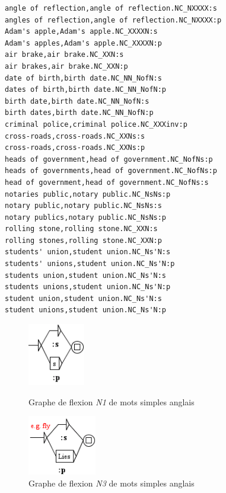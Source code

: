 \begin{verbatim}
angle of reflection,angle of reflection.NC_NXXXX:s
angles of reflection,angle of reflection.NC_NXXXX:p
Adam's apple,Adam's apple.NC_XXXXN:s
Adam's apples,Adam's apple.NC_XXXXN:p
air brake,air brake.NC_XXN:s
air brakes,air brake.NC_XXN:p
date of birth,birth date.NC_NN_NofN:s
dates of birth,birth date.NC_NN_NofN:p
birth date,birth date.NC_NN_NofN:s
birth dates,birth date.NC_NN_NofN:p
criminal police,criminal police.NC_XXXinv:p
cross-roads,cross-roads.NC_XXNs:s
cross-roads,cross-roads.NC_XXNs:p
heads of government,head of government.NC_NofNs:p
heads of governments,head of government.NC_NofNs:p
head of government,head of government.NC_NofNs:s
notaries public,notary public.NC_NsNs:p
notary public,notary public.NC_NsNs:s
notary publics,notary public.NC_NsNs:p
rolling stone,rolling stone.NC_XXN:s
rolling stones,rolling stone.NC_XXN:p
students' union,student union.NC_Ns'N:s
students' unions,student union.NC_Ns'N:p
students union,student union.NC_Ns'N:s
students unions,student union.NC_Ns'N:p
student union,student union.NC_Ns'N:s
student unions,student union.NC_Ns'N:p
\end{verbatim}
 
\begin{figure}[ht]
\begin{minipage}[c]{0.45\textwidth}
 \centering
 \includegraphics[width=2.5cm]{resources/img/N1'EN.png}
 \caption{Graphe de flexion \emph{N1} de mots simples anglais}
  \label{fig:N1'EN}
\end{minipage}\hfill
\begin{minipage}[c]{0.5\textwidth}
 \centering
 \includegraphics[width=3cm]{resources/img/N3'EN.png}
  \caption{Graphe de flexion \emph{N3} de mots simples anglais}
  \label{fig:N3'EN}
\end{minipage}
\end{figure}


